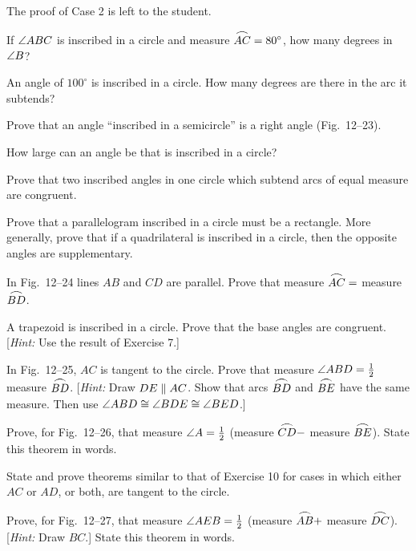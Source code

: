 \documentclass[11pt]{book}
\newcommand{\XIIarc}[1]{\overset{\raisebox{-0.25ex}{\scalebox{1.15}[0.85]{$\frown$}}}{#1}}
\begin{document}
The proof of Case 2 is left to the student.

\begin{exercisecols}
\begin{exlist}
\item If $\angle ABC$ is inscribed in a circle and measure
      $\XIIarc{AC} = 80^\circ$, how many degrees in $\angle B$?
\item An angle of $100^\circ$ is inscribed in a circle. How many degrees are
      there in the arc it subtends?
\item Prove that an angle ``inscribed in a semicircle'' is a right angle
      (Fig.~12--23).
\exfig{\FIGXIITWENTYTHREE}
\item How large can an angle be that is inscribed in a circle?
\item Prove that two inscribed angles in one circle which subtend arcs of equal
      measure are congruent.
\item Prove that a parallelogram inscribed in a circle must be a rectangle. More
      generally, prove that if a quadrilateral is inscribed in a circle, then the
      opposite angles are supplementary.
\item In Fig.~12--24 lines $AB$ and $CD$ are parallel. Prove that measure
      $\XIIarc{AC} = $ measure $\XIIarc{BD}$.
\exfig{\FIGXIITWENTYFOUR}
\item A trapezoid is inscribed in a circle. Prove that the base angles are
      congruent. [\emph{Hint:} Use the result of Exercise 7.]
\item[\stex 9.] In Fig.~12--25, $AC$ is tangent to the circle. Prove that
      measure $\angle ABD = \frac{1}{2}$ measure $\XIIarc{BD}$. [\emph{Hint:}
      Draw $DE \mathrel{\|} AC$. Show that arcs $\XIIarc{BD}$ and $\XIIarc{BE}$ have the
      same measure. Then use $\angle ABD \cong \angle BDE \cong \angle BED$.]
\exfig{\FIGXIITWENTYFIVE}
\item[\stex 10.] Prove, for Fig.~12--26, that measure
      $\angle A = \frac{1}{2}$ (measure $\XIIarc{CD} - $ measure $\XIIarc{BE}$).
      State this theorem in words.
\exfig{\FIGXIITWENTYSIX}
\item[\stex 11.] State and prove theorems similar to that of Exercise 10 for
      cases in which either $AC$ or $AD$, or both, are tangent to the circle.
\item[\stex 12.] Prove, for Fig.~12--27, that measure
      $\angle AEB = \frac{1}{2}$ (measure $\XIIarc{AB} + $ measure
      $\XIIarc{DC}$). [\emph{Hint:} Draw $BC$.] State this theorem in words.
\exfig{\FIGXIITWENTYSEVEN}

\end{exlist}
\end{exercisecols}
\end{document}
